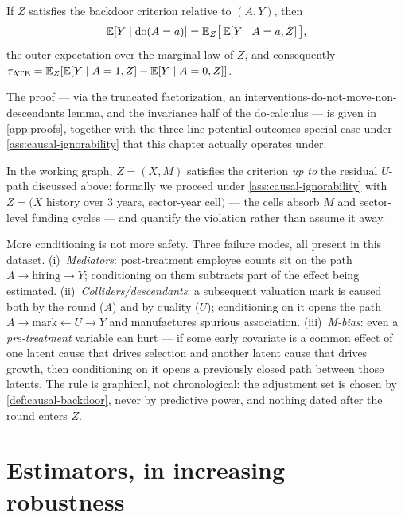 \begin{theorem}
\label{thm:causal-adjustment} If $Z$ satisfies the backdoor criterion relative to $(A, Y)$, then
\begin{equation}\label{eq:causal-adjustment}
\mathbb{E}[Y \mid \mathrm{do}(A = a)] = \mathbb{E}_Z\bigl[\, \mathbb{E}[Y \mid A = a, Z] \,\bigr],
\end{equation}
the outer expectation over the marginal law of $Z$, and consequently $\tau_{\mathrm{ATE}} =
\mathbb{E}_Z[\mathbb{E}[Y \mid A=1, Z] - \mathbb{E}[Y \mid A=0, Z]]$.
\end{theorem}

The proof --- via the truncated factorization, an interventions-do-not-move-non-descendants
lemma, and the invariance half of the do-calculus --- is given in \cref{app:proofs}, together
with the three-line potential-outcomes special case under \cref{ass:causal-ignorability} that
this chapter actually operates under.

In the working graph, $Z = (X, M)$ satisfies the criterion \emph{up to} the residual $U$-path
discussed above: formally we proceed under \cref{ass:causal-ignorability} with $Z = (X$ history
over 3 years, sector-year cell$)$ --- the cells absorb $M$ and sector-level funding cycles ---
and quantify the violation rather than assume it away.

\begin{warning}\label{warn:causal-badcontrols}
More conditioning is not more safety. Three failure modes, all present in this dataset.
(i)~\emph{Mediators}: post-treatment employee counts sit on the path $A \to \text{hiring} \to
Y$; conditioning on them subtracts part of the effect being estimated.
(ii)~\emph{Colliders/descendants}: a subsequent valuation mark is caused both by the round ($A$)
and by quality ($U$); conditioning on it opens the path $A \to \text{mark} \leftarrow U \to Y$
and manufactures spurious association. (iii)~\emph{M-bias}: even a \emph{pre-treatment} variable
can hurt --- if some early covariate is a common effect of one latent cause that drives
selection and another latent cause that drives growth, then conditioning on it opens a
previously closed path between those latents. The rule is graphical, not chronological: the
adjustment set is chosen by \cref{def:causal-backdoor}, never by predictive power, and nothing
dated after the round enters $Z$.
\end{warning}

\section{Estimators, in increasing robustness}\label{sec:causal-estimators}

